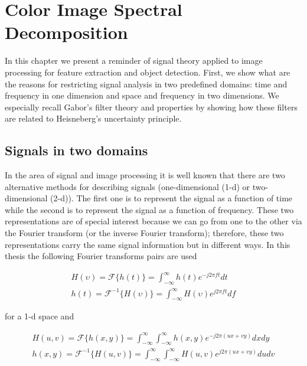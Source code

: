 
\chapter{Color Image Spectral Decomposition}

In this chapter we present a reminder of signal theory applied to image processing for feature extraction and object detection. First, we show what are the reasons for restricting signal analysis in two predefined domains: time and frequency in one dimension and space and frequency in two dimensions. We especially recall Gabor's filter theory and properties by showing how these filters are related to Heisneberg's uncertainty principle.

\section{Signals in two domains}

In the area of signal and image processing it is well known that there are two alternative methods for describing signals (one-dimensional (1-d) or two-dimensional (2-d)). The first one is to represent the signal as a function of time while the second is to represent the signal as a function of frequency. These two representations are of special interest because we can go from one to the other via the Fourier transform (or the inverse Fourier transform); therefore, these two representations carry the same signal information but in different ways. In this thesis the following Fourier transforms pairs are used

\begin{equation}\label{eq:fourier_transforms_1d}
    \begin{gathered}
        H(\upsilon) = \mathcal{F}\{h(t)\} = \int_{-\infty}^{\infty} h(t) e^{-j2\pi f t} dt \\
        h(t) = \mathcal{F}^{-1}\{H(\upsilon)\} = \int_{-\infty}^{\infty} H(\upsilon) e^{j2\pi f t} df 
    \end{gathered}
\end{equation}

for a 1-d space and 

\begin{equation}\label{eq:fourier_transforms_2d}
    \begin{gathered}
        H(u, v) = \mathcal{F}\{h(x, y)\} = \int_{-\infty}^{\infty} \int_{-\infty}^{\infty} h(x, y) e^{-j2\pi (ux + vy)} dx dy \\
        h(x, y) = \mathcal{F}^{-1}\{H(u, v)\} = \int_{-\infty}^{\infty} \int_{-\infty}^{\infty}  H(u, v) e^{j2\pi (ux + vy)} du dv 
    \end{gathered}
\end{equation}

